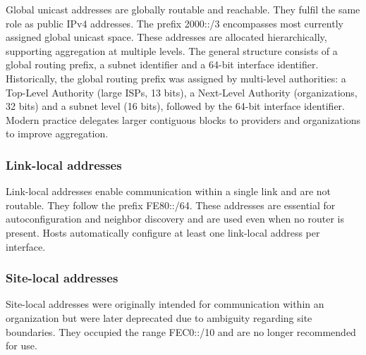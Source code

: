 \begin{center}
\end{center}

Global unicast addresses are globally routable and reachable. They fulfil the same role as public IPv4 addresses. The prefix 2000::/3 encompasses most currently assigned global unicast space. These addresses are allocated hierarchically, supporting aggregation at multiple levels. The general structure consists of a global routing prefix, a subnet identifier and a 64-bit interface identifier. Historically, the global routing prefix was assigned by multi-level authorities: a Top-Level
Authority (large ISPs, 13 bits), a Next-Level Authority (organizations, 32 bits) and a subnet
level (16 bits), followed by the 64-bit interface identifier. Modern practice delegates larger
contiguous blocks to providers and organizations to improve aggregation.

\begin{center}
\end{center}

\begin{center}
\end{center}

\subsubsection*{Link-local addresses}

Link-local addresses enable communication within a single link and are not routable. They follow the prefix FE80::/64. These addresses are essential for autoconfiguration and neighbor discovery and are used even when no router is present. Hosts automatically configure at least one link-local address per interface.

\subsubsection*{Site-local addresses}

Site-local addresses were originally intended for communication within an organization but were later deprecated due to ambiguity regarding site boundaries. They occupied the range FEC0::/10 and are no longer recommended for use.

